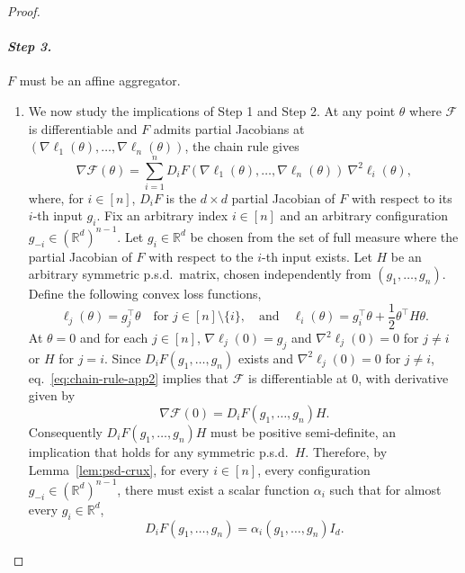 \documentclass[twoside,11pt]{article}
\newcommand{\R}{\mathbb{R}}
\newcommand{\F}{\mathcal{F}}
\begin{document}
\begin{proof}
    \paragraph{\textit{\textbf{Step 3.}}} $F$ must be an affine aggregator.
    \begin{enumerate}
        \item[\textit{(i)}]
        We now study the implications of Step 1 and Step 2. 
        At any point $\theta$ where $\F$ is differentiable and $F$ admits partial Jacobians at $(\nabla \ell_1(\theta), \ldots, \nabla \ell_n(\theta))$, the chain rule gives
        \begin{equation}\label{eq:chain-rule-app2}
            \nabla \F(\theta) = \sum_{i=1}^n D_i F(\nabla \ell_1(\theta), \ldots, \nabla \ell_n(\theta))\ \nabla^2 \ell_i(\theta),
        \end{equation}
        where, for $i \in [n]$, $D_i F$ is the $d \times d$ partial Jacobian of $F$ with respect to its $i$-th input $g_i$.
        Fix an arbitrary index $i \in [n]$ and an arbitrary configuration $g_{-i} \in (\R^d)^{n-1}$. 
        Let $g_i \in \R^d$ be chosen from the set of full measure where the partial Jacobian of $F$ with respect to the $i$-th input exists.
        Let $H$ be an arbitrary symmetric p.s.d.\ matrix, chosen independently from $(g_1, \ldots, g_n)$. 
        Define the following convex loss functions,
         \[
          \ell_j(\theta) = g_j^{\intercal} \theta \quad\text{for } j \in [n]\setminus\{i\}, \quad\text{and}\quad \ell_i(\theta) = g_i^{\intercal} \theta + \frac{1}{2} \theta^\intercal H \theta. 
        \]
        At $\theta = 0$ and for each $j\in[n]$, $\nabla \ell_j(0) = g_j$ and $\nabla^2 \ell_j(0) = 0$ for $j \neq i$ or $H$ for $j=i$.
        Since $D_i F (g_1, \ldots, g_n)$ exists and $\nabla^2 \ell_j(0) = 0$ for $j \neq i$, eq.~\ref{eq:chain-rule-app2} implies that $\F$ is differentiable at $0$, with derivative given by
        \begin{equation}\label{eq:chain-rule-uno}
            \nabla \F(0) = D_{i} F(g_1, \ldots, g_n) H.
        \end{equation}
        Consequently $D_{i} F(g_1, \ldots, g_n) H$ must be positive semi-definite, an implication that holds for any symmetric p.s.d.\ $H$. 
        Therefore, by Lemma~\ref{lem:psd-crux}, for every $i \in [n]$, every configuration $g_{-i} \in (\R^d)^{n-1}$, there must exist a scalar function $\alpha_i$ such that for almost every $g_i \in \R^d$, 
        \begin{equation}\label{eq:intermediate-diagonal-cvx}
            D_i F(g_1, \ldots, g_n) = \alpha_i(g_1, \ldots, g_n) I_d.
        \end{equation}


\end{enumerate}
\end{proof}
\end{document}
